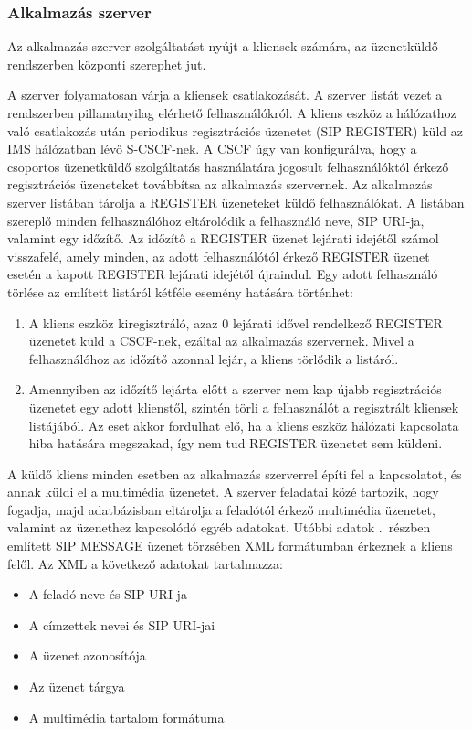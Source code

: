 \subsubsection{Alkalmazás szerver}
\label{sec:appserver}

Az alkalmazás szerver szolgáltatást nyújt a kliensek számára, az üzenetküldő rendszerben központi szerephet jut.

A szerver folyamatosan várja a kliensek csatlakozását. A szerver listát vezet a rendszerben pillanatnyilag elérhető felhasználókról. A kliens eszköz a hálózathoz való csatlakozás után periodikus regisztrációs üzenetet (SIP REGISTER) küld az IMS hálózatban lévő S-CSCF-nek. A CSCF úgy van konfigurálva, hogy a csoportos üzenetküldő szolgáltatás használatára jogosult felhasználóktól érkező regisztrációs üzeneteket továbbítsa az alkalmazás szervernek. Az alkalmazás szerver listában tárolja a REGISTER üzeneteket küldő felhasználókat. A listában szereplő minden felhasználóhoz eltárolódik a felhasználó neve, SIP URI-ja, valamint egy időzítő. Az időzítő a REGISTER üzenet lejárati idejétől számol visszafelé, amely minden, az adott felhasználótól érkező REGISTER üzenet esetén a kapott REGISTER lejárati idejétől újraindul. Egy adott felhasználó törlése az említett listáról kétféle esemény hatására történhet:
\begin{enumerate}\itemsep1pt
\item	A kliens eszköz kiregisztráló, azaz 0 lejárati idővel rendelkező REGISTER üzenetet küld a CSCF-nek, ezáltal az alkalmazás szervernek. Mivel a felhasználóhoz az időzítő azonnal lejár, a kliens törlődik a listáról. 
\item Amennyiben az időzítő lejárta előtt a szerver nem kap újabb regisztrációs üzenetet egy adott klienstől, szintén törli a felhasználót a regisztrált kliensek listájából. Az eset akkor fordulhat elő, ha a kliens eszköz hálózati kapcsolata hiba hatására megszakad, így nem tud REGISTER üzenetet sem küldeni.
\end{enumerate} 

A küldő kliens minden esetben az alkalmazás szerverrel építi fel a kapcsolatot, és annak küldi el a multimédia üzenetet. A szerver feladatai közé tartozik, hogy fogadja, majd adatbázisban eltárolja a feladótól érkező multimédia üzenetet, valamint az üzenethez kapcsolódó egyéb adatokat. Utóbbi adatok .~részben említett SIP MESSAGE üzenet törzsében XML formátumban érkeznek a kliens felől. Az XML a következő adatokat tartalmazza: 

\begin{itemize}\itemsep1pt
\item	A feladó neve és SIP URI-ja
\item A címzettek nevei és SIP URI-jai
\item A üzenet azonosítója
\item Az üzenet tárgya
\item A multimédia tartalom formátuma
\end{itemize}

